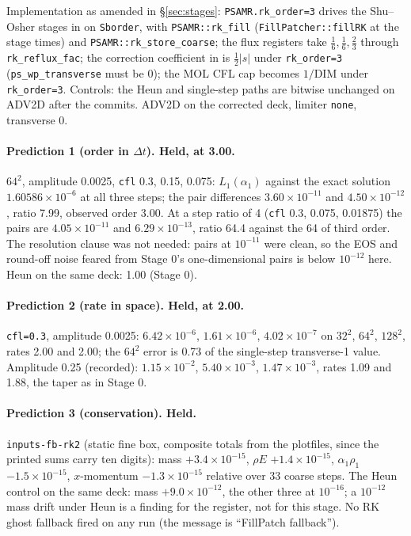 \documentclass[11pt,a4paper]{article}
\newcommand{\code}[1]{\texttt{\small #1}}
\begin{document}
Implementation as amended in \S\ref{sec:stages}: \code{PSAMR.rk\_order=3}
drives the Shu--Osher stages in  on \code{Sborder},
with \code{PSAMR::rk\_fill} (\code{FillPatcher::fillRK} at the stage
times) and \code{PSAMR::rk\_store\_coarse}; the flux registers take
$\tfrac16, \tfrac16, \tfrac23$ through \code{rk\_reflux\_fac}; the
correction coefficient in  is $\tfrac12|s|$ under
\code{rk\_order=3} (\code{ps\_wp\_transverse} must be 0); the MOL CFL
cap becomes $1/\mathrm{DIM}$ under \code{rk\_order=3}.  Controls: the Heun
and single-step paths are bitwise unchanged on ADV2D after the commits.
ADV2D on the corrected deck, limiter \code{none}, transverse 0.

\paragraph{Prediction 1 (order in $\Delta t$).  Held, at 3.00.}
$64^2$, amplitude 0.0025, \code{cfl} 0.3, 0.15, 0.075: $L_1(\alpha_1)$
against the exact solution $1.60586\times10^{-6}$ at all three steps; the
pair differences $3.60\times10^{-11}$ and $4.50\times10^{-12}$, ratio
7.99, observed order 3.00.  At a step ratio of 4 (\code{cfl} 0.3, 0.075,
0.01875) the pairs are $4.05\times10^{-11}$ and $6.29\times10^{-13}$,
ratio 64.4 against the 64 of third order.  The resolution clause was not
needed: pairs at $10^{-11}$ were clean, so the EOS and round-off noise
feared from Stage 0's one-dimensional pairs is below $10^{-12}$ here.
Heun on the same deck: 1.00 (Stage 0).

\paragraph{Prediction 2 (rate in space).  Held, at 2.00.}
\code{cfl=0.3}, amplitude 0.0025: $6.42\times10^{-6}$, $1.61\times10^{-6}$,
$4.02\times10^{-7}$ on $32^2$, $64^2$, $128^2$, rates 2.00 and 2.00; the
$64^2$ error is 0.73 of the single-step transverse-1 value.  Amplitude
0.25 (recorded): $1.15\times10^{-2}$, $5.40\times10^{-3}$,
$1.47\times10^{-3}$, rates 1.09 and 1.88, the taper as in Stage 0.

\paragraph{Prediction 3 (conservation).  Held.}
\code{inputs-fb-rk2} (static fine box, composite totals from the
plotfiles, since the printed sums carry ten digits): mass
$+3.4\times10^{-15}$, $\rho E$ $+1.4\times10^{-15}$, $\alpha_1\rho_1$
$-1.5\times10^{-15}$, $x$-momentum $-1.3\times10^{-15}$ relative over
33 coarse steps.  The Heun control on the same deck: mass
$+9.0\times10^{-12}$, the other three at $10^{-16}$; a $10^{-12}$ mass
drift under Heun is a finding for the register, not for this stage.  No
RK ghost fallback fired on any run (the message is
``FillPatch fallback'').
\end{document}
